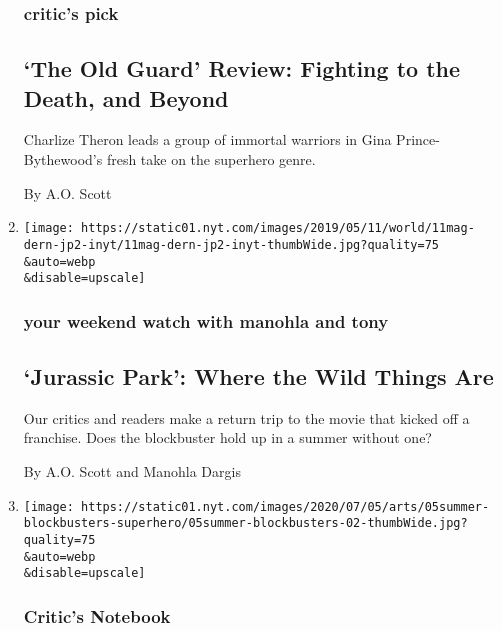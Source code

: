 \begin{enumerate}
{  \subsubsection{critic's pick}\label{critics-pick-1}}

  \hypertarget{the-old-guard-review-fighting-to-the-death-and-beyond}{%
  \subsection{`The Old Guard' Review: Fighting to the Death, and
  Beyond}\label{the-old-guard-review-fighting-to-the-death-and-beyond}}

  Charlize Theron leads a group of immortal warriors in Gina
  Prince-Bythewood's fresh take on the superhero genre.

  By A.O. Scott
\item
  \href{/2020/07/02/movies/jurassic-park.html}{}

  \texttt{[image: https://static01.nyt.com/images/2019/05/11/world/11mag-dern-jp2-inyt/11mag-dern-jp2-inyt-thumbWide.jpg?quality=75\\\&auto=webp\\\&disable=upscale]}

  \hypertarget{your-weekend-watch-with-manohla-and-tony}{%
  \subsubsection{your weekend watch with manohla and
  tony}\label{your-weekend-watch-with-manohla-and-tony}}

  \hypertarget{jurassic-park-where-the-wild-things-are}{%
  \subsection{`Jurassic Park': Where the Wild Things
  Are}\label{jurassic-park-where-the-wild-things-are}}

  Our critics and readers make a return trip to the movie that kicked
  off a franchise. Does the blockbuster hold up in a summer without one?

  By A.O. Scott and Manohla Dargis
\item
  \href{/2020/07/01/movies/superheroes-marvel-DC.html}{}

  \texttt{[image: https://static01.nyt.com/images/2020/07/05/arts/05summer-blockbusters-superhero/05summer-blockbusters-02-thumbWide.jpg?quality=75\\\&auto=webp\\\&disable=upscale]}

  \hypertarget{critics-notebook}{%
  \subsubsection{Critic's Notebook}\label{critics-notebook}}


\end{enumerate}
